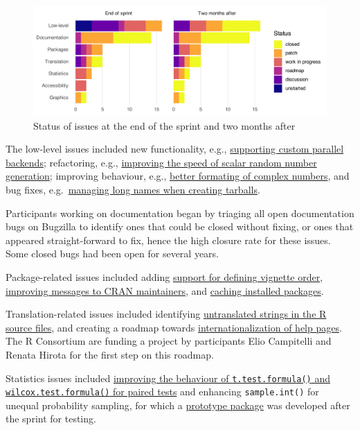 \begin{figure}
\includegraphics[width=1\linewidth]{figures/bug_review} \caption{Status of issues at the end of the sprint and two months after}\label{fig:issues}
\end{figure}

The low-level issues included new functionality, e.g., \href{https://bugs.r-project.org/show_bug.cgi?id=18587}{supporting custom parallel backends}; refactoring, e.g.,
\href{https://bugs.r-project.org/show_bug.cgi?id=18600}{improving the speed of scalar random number generation}; improving behaviour, e.g., \href{https://bugs.r-project.org/show_bug.cgi?id=16752}{better formating of complex numbers}, and bug fixes, e.g.~\href{https://bugs.r-project.org/show_bug.cgi?id=17871}{managing long names when creating tarballs}.

Participants working on documentation began by triaging all open documentation bugs on Bugzilla to identify ones that could be closed without fixing, or ones that appeared straight-forward to fix, hence the high closure rate for these issues. Some closed bugs had been open for several years.

Package-related issues included adding \href{https://bugs.r-project.org/show_bug.cgi?id=18576}{support for defining vignette order}, \href{https://github.com/r-devel/r-project-sprint-2023/issues/55}{improving messages to CRAN maintainers}, and \href{https://github.com/r-devel/r-project-sprint-2023/issues/78}{caching installed packages}.

Translation-related issues included identifying \href{https://bugs.r-project.org/show_bug.cgi?id=17819}{untranslated strings in the
R source files}, and creating
a roadmap towards \href{https://github.com/r-devel/r-project-sprint-2023/issues/35}{internationalization of help pages}. The R Consortium are funding a project by participants Elio Campitelli and Renata Hirota for the first step on this roadmap.

Statistics issues included \href{https://bugs.r-project.org/show_bug.cgi?id=14359}{improving the behaviour of \texttt{t.test.formula()} and \texttt{wilcox.test.formula()} for paired tests} and enhancing
\texttt{sample.int()} for unequal probability sampling, for which a \href{https://github.com/dickoa/sondage}{prototype package} was developed after the sprint for testing.

